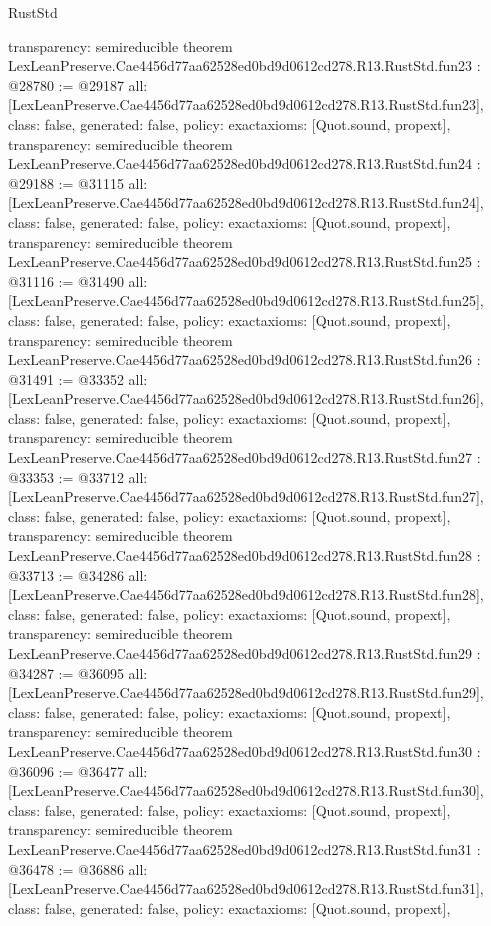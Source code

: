 \begin{lexlean}{RustStd}
\begin{coremodule}
{  transparency: semireducible
}
theorem LexLeanPreserve.Cae4456d77aa62528ed0bd9d0612cd278.R13.RustStd.fun23 : @28780 := @29187 {
  all: [LexLeanPreserve.Cae4456d77aa62528ed0bd9d0612cd278.R13.RustStd.fun23],
  class: false,
  generated: false,
  policy: exact{axioms: [Quot.sound, propext]},
  transparency: semireducible
}
theorem LexLeanPreserve.Cae4456d77aa62528ed0bd9d0612cd278.R13.RustStd.fun24 : @29188 := @31115 {
  all: [LexLeanPreserve.Cae4456d77aa62528ed0bd9d0612cd278.R13.RustStd.fun24],
  class: false,
  generated: false,
  policy: exact{axioms: [Quot.sound, propext]},
  transparency: semireducible
}
theorem LexLeanPreserve.Cae4456d77aa62528ed0bd9d0612cd278.R13.RustStd.fun25 : @31116 := @31490 {
  all: [LexLeanPreserve.Cae4456d77aa62528ed0bd9d0612cd278.R13.RustStd.fun25],
  class: false,
  generated: false,
  policy: exact{axioms: [Quot.sound, propext]},
  transparency: semireducible
}
theorem LexLeanPreserve.Cae4456d77aa62528ed0bd9d0612cd278.R13.RustStd.fun26 : @31491 := @33352 {
  all: [LexLeanPreserve.Cae4456d77aa62528ed0bd9d0612cd278.R13.RustStd.fun26],
  class: false,
  generated: false,
  policy: exact{axioms: [Quot.sound, propext]},
  transparency: semireducible
}
theorem LexLeanPreserve.Cae4456d77aa62528ed0bd9d0612cd278.R13.RustStd.fun27 : @33353 := @33712 {
  all: [LexLeanPreserve.Cae4456d77aa62528ed0bd9d0612cd278.R13.RustStd.fun27],
  class: false,
  generated: false,
  policy: exact{axioms: [Quot.sound, propext]},
  transparency: semireducible
}
theorem LexLeanPreserve.Cae4456d77aa62528ed0bd9d0612cd278.R13.RustStd.fun28 : @33713 := @34286 {
  all: [LexLeanPreserve.Cae4456d77aa62528ed0bd9d0612cd278.R13.RustStd.fun28],
  class: false,
  generated: false,
  policy: exact{axioms: [Quot.sound, propext]},
  transparency: semireducible
}
theorem LexLeanPreserve.Cae4456d77aa62528ed0bd9d0612cd278.R13.RustStd.fun29 : @34287 := @36095 {
  all: [LexLeanPreserve.Cae4456d77aa62528ed0bd9d0612cd278.R13.RustStd.fun29],
  class: false,
  generated: false,
  policy: exact{axioms: [Quot.sound, propext]},
  transparency: semireducible
}
theorem LexLeanPreserve.Cae4456d77aa62528ed0bd9d0612cd278.R13.RustStd.fun30 : @36096 := @36477 {
  all: [LexLeanPreserve.Cae4456d77aa62528ed0bd9d0612cd278.R13.RustStd.fun30],
  class: false,
  generated: false,
  policy: exact{axioms: [Quot.sound, propext]},
  transparency: semireducible
}
theorem LexLeanPreserve.Cae4456d77aa62528ed0bd9d0612cd278.R13.RustStd.fun31 : @36478 := @36886 {
  all: [LexLeanPreserve.Cae4456d77aa62528ed0bd9d0612cd278.R13.RustStd.fun31],
  class: false,
  generated: false,
  policy: exact{axioms: [Quot.sound, propext]},
}
\end{coremodule}
\end{lexlean}
